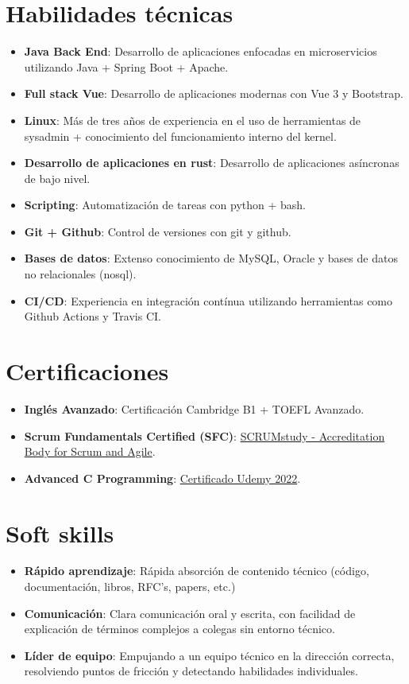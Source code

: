 \documentclass[letterpaper,11pt]{article}
\newcommand{\resumeItem}[2]{
  \item\small{
    \textbf{#1}{: #2 \vspace{-2pt}}
  }
}
\newcommand{\resumeSubItem}[2]{\resumeItem{#1}{#2}\vspace{-4pt}}
\newcommand{\resumeSubHeadingListStart}{\begin{itemize}[leftmargin=*]}
\newcommand{\resumeSubHeadingListEnd}{\end{itemize}}
\begin{document}
\section{Habilidades técnicas}
 \resumeSubHeadingListStart
  \resumeSubItem{Java Back End}{Desarrollo de aplicaciones enfocadas en
  microservicios utilizando Java + Spring Boot + Apache.}
  \resumeSubItem{Full stack Vue}{Desarrollo de aplicaciones modernas con
  Vue 3 y Bootstrap.}
  \resumeSubItem{Linux}{Más de tres años de experiencia en el uso de
  herramientas de sysadmin + conocimiento del funcionamiento interno del
  kernel.}
  \resumeSubItem{Desarrollo de aplicaciones en rust}{Desarrollo de
  aplicaciones asíncronas de bajo nivel.}
  \resumeSubItem{Scripting}{Automatización de tareas con python + bash.}
  \resumeSubItem{Git + Github}{Control de versiones con git y github.}
  \resumeSubItem{Bases de datos}{Extenso conocimiento de MySQL, Oracle y
  bases de datos no relacionales (nosql).}
  \resumeSubItem{CI/CD}{Experiencia en integración contínua utilizando
  herramientas como Github Actions y Travis CI.}
\resumeSubHeadingListEnd

\section{Certificaciones}
 \resumeSubHeadingListStart
  \resumeSubItem{Inglés Avanzado}{Certificación Cambridge B1 + TOEFL
  Avanzado.}
  \resumeSubItem{Scrum Fundamentals Certified (SFC)}{
  \href{https://www.scrumstudy.com/certification/verify?type=SFC&number=931455}{SCRUMstudy - Accreditation Body for Scrum and Agile}.}
  \resumeSubItem{Advanced C
  Programming}{\href{https://ude.my/UC-0dadf9b3-11ae-4f4d-8a76-6f1aa45b2b53/}{Certificado Udemy
  2022}.}
 \resumeSubHeadingListEnd

\section{Soft skills}
 \resumeSubHeadingListStart
  \resumeSubItem{Rápido aprendizaje}{Rápida absorción de contenido
  técnico (código, documentación, libros, RFC's, papers, etc.)}
  \resumeSubItem{Comunicación}{Clara comunicación oral y escrita, con
  facilidad de explicación de términos complejos a colegas sin entorno
  técnico.}
  \resumeSubItem{Líder de equipo}{Empujando a un equipo técnico en la dirección
  correcta, resolviendo puntos de fricción y detectando habilidades
  individuales.}
 \resumeSubHeadingListEnd



\end{document}
